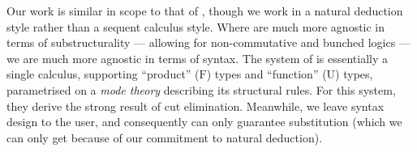 Our work is similar in scope to that of \citet{LicataSR17}, though we work in
a natural deduction style rather than a sequent calculus style.
Where \citeauthor{LicataSR17} are much more agnostic in terms of
substructurality --- allowing for non-commutative and bunched logics ---
we are much more agnostic in terms of syntax.
The system of \citeauthor{LicataSR17} is essentially a single calculus,
supporting ``product'' ($\mathrm F$) types and ``function'' ($\mathrm U$)
types, parametrised on a \emph{mode theory} describing its structural rules.
For this system, they derive the strong result of cut elimination.
Meanwhile, we leave syntax design to the user, and consequently can only
guarantee substitution (which we can only get because of our commitment to
natural deduction).
